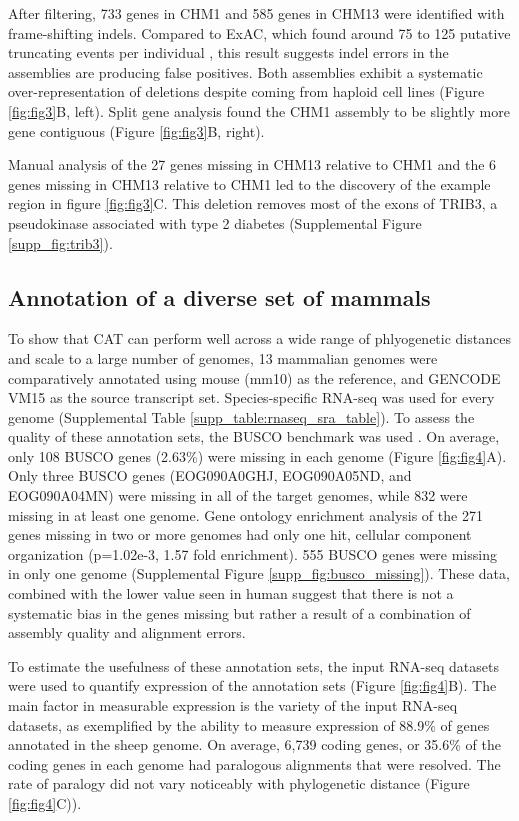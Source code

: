 \documentclass[fleqn,10pt]{wlscirep}
\begin{document}
	After filtering, 733 genes in CHM1 and 585 genes in CHM13 were identified with frame-shifting indels. Compared to ExAC, which found around 75 to 125 putative truncating events per individual \cite{karczewski2016exac}, this result suggests indel errors in the assemblies are producing false positives. Both assemblies exhibit a systematic over-representation of deletions despite coming from haploid cell lines (Figure \ref{fig:fig3}B, left). Split gene analysis found the CHM1 assembly to be slightly more gene contiguous (Figure \ref{fig:fig3}B, right).

Manual analysis of the 27 genes missing in CHM13 relative to CHM1 and the 6 genes missing in CHM13 relative to CHM1 led to the discovery of the example region in figure \ref{fig:fig3}C. This deletion removes most of the exons of TRIB3, a pseudokinase associated with type 2 diabetes \cite{shi2009association} (Supplemental Figure \ref{supp_fig:trib3}).


\subsection{Annotation of a diverse set of mammals}
	To show that CAT can perform well across a wide range of phlyogenetic distances and scale to a large number of genomes, 13 mammalian genomes were comparatively annotated using mouse (mm10) as the reference, and GENCODE VM15 as the source transcript set. Species-specific RNA-seq was used for every genome (Supplemental Table \ref{supp_table:rnaseq_sra_table}). To assess the quality of these annotation sets, the BUSCO benchmark was used \cite{simao2015busco}. On average, only 108 BUSCO genes (2.63\%) were missing in each genome  (Figure \ref{fig:fig4}A). Only three BUSCO genes (EOG090A0GHJ, EOG090A05ND, and EOG090A04MN) were missing in all of the target genomes, while 832 were missing in at least one genome. Gene ontology enrichment analysis of the 271 genes missing in two or more genomes had only one hit, cellular component organization (p=1.02e-3, 1.57 fold enrichment). 555 BUSCO genes were missing in only one genome (Supplemental Figure \ref{supp_fig:busco_missing}). These data, combined with the lower value seen in human suggest that there is not a systematic bias in the genes missing but rather a result of a combination of assembly quality and alignment errors.

To estimate the usefulness of these annotation sets, the input RNA-seq datasets were used to quantify expression of the annotation sets (Figure \ref{fig:fig4}B). The main factor in measurable expression is the variety of the input RNA-seq datasets, as exemplified by the ability to measure expression of 88.9\% of genes annotated in the sheep genome. On average, 6,739 coding genes, or 35.6\% of the coding genes in each genome had paralogous alignments that were resolved. The rate of paralogy did not vary noticeably with phylogenetic distance (Figure \ref{fig:fig4}C)).
\end{document}
